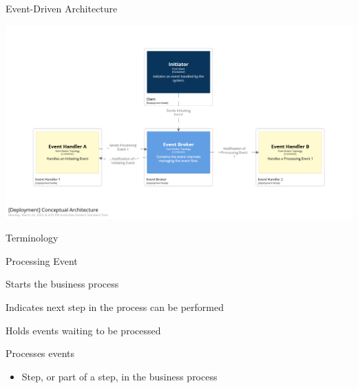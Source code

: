 \documentclass{slide}
\begin{document}
\begin{frame}{Event-Driven Architecture}
    \begin{adjustwidth}{-10mm}{-10mm}
        \centering
        \includegraphics[trim=195 195 195 195,clip,width=0.97\paperwidth]{../../notes/event/diagrams/conceptual-architecture.png}
    \end{adjustwidth}
\end{frame}

\begin{frame}{Terminology}
    \vspace{1mm}
    {\LARGE
    \begin{labeling}{Processing Event}
        \item<1->[\color{secondary} Initiating Event] Starts the business process
        \vspace{3mm}
        \item<2->[\color{secondary} Processing Event] Indicates next step in the process can be performed
        \vspace{3mm}
        \item<3->[\color{secondary} Event Channel] Holds events waiting to be processed
        \vspace{3mm}
        \item<4->[\color{secondary} Event Handler] Processes events
        \begin{itemize}
            \Large\item Step, or part of a step, in the business process
        \end{itemize}
    \end{labeling}
    }
\end{frame}
\end{document}
